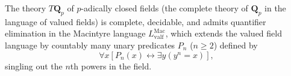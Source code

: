 The theory $T\mathbf{Q}_p$ of $p$-adically closed fields (the complete theory of $\mathbf{Q}_p$ in the language of valued fields) is complete, decidable, and admits quantifier elimination in the Macintyre language $L_{\mathrm{valf}}^{\mathrm{Mac}}$, which extends the valued field language by countably many unary predicates $P_n$ ($n \geq 2$) defined by
$$\forall x [P_n(x) \leftrightarrow \exists y (y^n = x)],$$
singling out the $n$th powers in the field.
